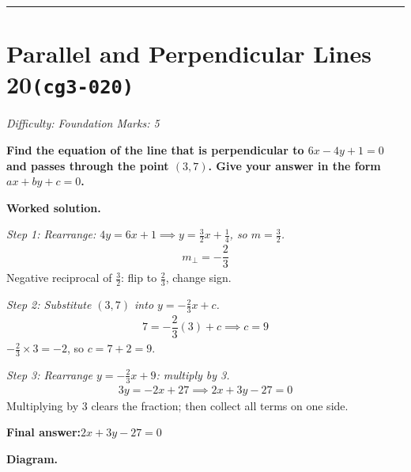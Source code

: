\documentclass[11pt]{article}
\newcommand{\question}[1]{\par\medskip\noindent\textbf{#1}\par}
\begin{document}
\medskip\hrule

\section*{Parallel and Perpendicular Lines 20\quad\small\texttt{(cg3-020)}}
\textit{Difficulty: Foundation \quad\textbar\quad Marks: 5}

\question{Find the equation of the line that is perpendicular to \( 6x - 4y + 1 = 0 \) and passes through the point \( (3, 7) \). Give your answer in the form \( ax + by + c = 0 \).}

\textbf{Worked solution.}

\textit{Step 1: Rearrange: \( 4y = 6x + 1 \implies y = \frac{3}{2}x + \frac{1}{4} \), so \( m = \frac{3}{2} \).}
\[\begin{gathered}
m_\perp = -\dfrac{2}{3}
\end{gathered}\]
Negative reciprocal of \( \tfrac{3}{2} \): flip to \( \tfrac{2}{3} \), change sign.

\textit{Step 2: Substitute \( (3, 7) \) into \( y = -\frac{2}{3}x + c \).}
\[\begin{gathered}
7 = -\dfrac{2}{3}(3) + c \implies c = 9
\end{gathered}\]
\( -\tfrac{2}{3} \times 3 = -2 \), so \( c = 7 + 2 = 9 \).

\textit{Step 3: Rearrange \( y = -\frac{2}{3}x + 9 \): multiply by 3.}
\[\begin{gathered}
3y = -2x + 27 \implies 2x + 3y - 27 = 0
\end{gathered}\]
Multiplying by \( 3 \) clears the fraction; then collect all terms on one side.

\begin{answerbox}
\textbf{Final answer:}\quad \(\displaystyle 2x + 3y - 27 = 0\)
\end{answerbox}
\textbf{Diagram.}
\end{document}
